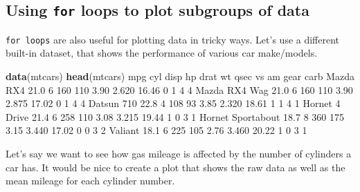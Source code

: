 \documentclass[
]{book}
\newenvironment{Shaded}{\begin{snugshade}}{\end{snugshade}}
\newcommand{\DecValTok}[1]{\textcolor[rgb]{0.00,0.00,0.81}{#1}}
\newcommand{\FloatTok}[1]{\textcolor[rgb]{0.00,0.00,0.81}{#1}}
\newcommand{\KeywordTok}[1]{\textcolor[rgb]{0.13,0.29,0.53}{\textbf{#1}}}
\newcommand{\NormalTok}[1]{#1}
\begin{document}
\hypertarget{using-for-loops-to-plot-subgroups-of-data}{%
\subsection*{\texorpdfstring{Using \texttt{for} loops to plot subgroups of data}{Using for loops to plot subgroups of data}}\label{using-for-loops-to-plot-subgroups-of-data}}

\texttt{for\ loops} are also useful for plotting data in tricky ways. Let's use a different built-in dataset, that shows the performance of various car make/models.

\begin{Shaded}
\begin{Highlighting}[]
\KeywordTok{data}\NormalTok{(mtcars)}
\KeywordTok{head}\NormalTok{(mtcars)}
\NormalTok{                   mpg cyl disp  hp drat    wt  qsec vs am gear carb}
\NormalTok{Mazda RX4         }\FloatTok{21.0}   \DecValTok{6}  \DecValTok{160} \DecValTok{110} \FloatTok{3.90} \FloatTok{2.620} \FloatTok{16.46}  \DecValTok{0}  \DecValTok{1}    \DecValTok{4}    \DecValTok{4}
\NormalTok{Mazda RX4 Wag     }\FloatTok{21.0}   \DecValTok{6}  \DecValTok{160} \DecValTok{110} \FloatTok{3.90} \FloatTok{2.875} \FloatTok{17.02}  \DecValTok{0}  \DecValTok{1}    \DecValTok{4}    \DecValTok{4}
\NormalTok{Datsun }\DecValTok{710}        \FloatTok{22.8}   \DecValTok{4}  \DecValTok{108}  \DecValTok{93} \FloatTok{3.85} \FloatTok{2.320} \FloatTok{18.61}  \DecValTok{1}  \DecValTok{1}    \DecValTok{4}    \DecValTok{1}
\NormalTok{Hornet }\DecValTok{4}\NormalTok{ Drive    }\FloatTok{21.4}   \DecValTok{6}  \DecValTok{258} \DecValTok{110} \FloatTok{3.08} \FloatTok{3.215} \FloatTok{19.44}  \DecValTok{1}  \DecValTok{0}    \DecValTok{3}    \DecValTok{1}
\NormalTok{Hornet Sportabout }\FloatTok{18.7}   \DecValTok{8}  \DecValTok{360} \DecValTok{175} \FloatTok{3.15} \FloatTok{3.440} \FloatTok{17.02}  \DecValTok{0}  \DecValTok{0}    \DecValTok{3}    \DecValTok{2}
\NormalTok{Valiant           }\FloatTok{18.1}   \DecValTok{6}  \DecValTok{225} \DecValTok{105} \FloatTok{2.76} \FloatTok{3.460} \FloatTok{20.22}  \DecValTok{1}  \DecValTok{0}    \DecValTok{3}    \DecValTok{1}
\end{Highlighting}
\end{Shaded}

Let's say we want to see how gas mileage is affected by the number of cylinders a car has. It would be nice to create a plot that shows the raw data as well as the mean mileage for each cylinder number.
\end{document}
